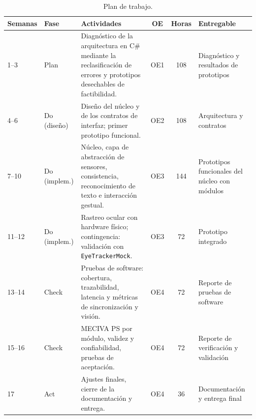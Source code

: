 \begin{table}[H]
\centering
\caption{Plan de trabajo.}
\label{tab:plan_trabajo}
\footnotesize
\begin{tabularx}{\textwidth}{l l >{\raggedright\arraybackslash}X c c >{\raggedright\arraybackslash}p{3cm}}
\toprule
\textbf{Semanas} & \textbf{Fase} & \textbf{Actividades} & \textbf{OE} & \textbf{Horas} & \textbf{Entregable} \\ \midrule
1--3 & Plan & Diagnóstico de la arquitectura en C\# mediante la reclasificación de errores y prototipos desechables de factibilidad. & OE1 & 108 & Diagnóstico y resultados de prototipos \\ \midrule
4--6 & Do (diseño) & Diseño del núcleo y de los contratos de interfaz; primer prototipo funcional. & OE2 & 108 & Arquitectura y contratos \\ \midrule
7--10 & Do (implem.) & Núcleo, capa de abstracción de sensores, consistencia, reconocimiento de texto e interacción gestual. & OE3 & 144 & Prototipos funcionales del núcleo con módulos \\ \midrule
11--12 & Do (implem.) & Rastreo ocular con hardware físico; contingencia: validación con \texttt{EyeTrackerMock}. & OE3 & 72 & Prototipo integrado \\ \midrule
13--14 & Check & Pruebas de software: cobertura, trazabilidad, latencia y métricas de sincronización y visión. & OE4 & 72 & Reporte de pruebas de software \\ \midrule
15--16 & Check & MECIVA PS por módulo, validez y confiabilidad, pruebas de aceptación. & OE4 & 72 & Reporte de verificación y validación \\ \midrule
17 & Act & Ajustes finales, cierre de la documentación y entrega. & OE4 & 36 & Documentación y entrega final \\ \bottomrule
\end{tabularx}
\end{table}
